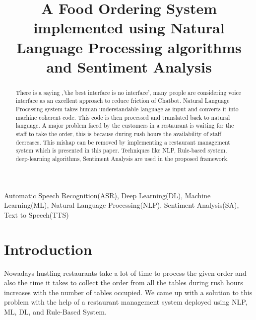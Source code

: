 \documentclass[conference]{IEEEtran}
\begin{document}
 \title{A Food Ordering System implemented using Natural Language Processing algorithms and Sentiment Analysis}
\author{
	\and
	\and
	}
\maketitle
 
 
\begin{abstract}
There is a saying ,'the best interface is no interface', many people are considering voice interface as an excellent approach to reduce friction of Chatbot. Natural Language Processing system takes human understandable language as input and converts it into machine coherent code. This code is then processed and translated back to natural language. A major problem faced by the customers in a restaurant is waiting for the staff to take the order, this is because during rush hours the availability of staff decreases. This mishap can be removed by implementing a restaurant management system which is presented in this paper. Techniques like NLP, Rule-based system, deep-learning algorithms, Sentiment Analysis are used in the proposed framework.\\
\end{abstract}
\begin{IEEEkeywords}
	 Automatic Speech Recognition(ASR), Deep Learning(DL), Machine Learning(ML), Natural Language Processing(NLP), Sentiment Analysis(SA), Text to Speech(TTS)
\end{IEEEkeywords}
\section{Introduction}
Nowadays hustling restaurants take a lot of time to process the given order and also the time it takes to collect the order from all the tables during rush hours increases with the number of tables occupied. We came up with a solution to this problem with the help of a restaurant management system deployed using NLP, ML, DL, and Rule-Based System. 
\end{document}
